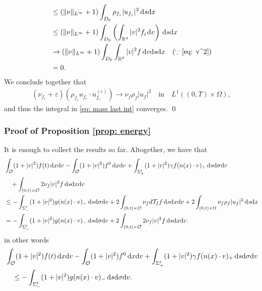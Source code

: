 \documentclass[10pt, reqno]{amsart}
\theoremstyle{plain}
\theoremstyle{definition}
\theoremstyle{remark}
\renewenvironment{proof}[1][\proofname]{\noindent{\scshape #1.\quad}}{\qed}
\numberwithin{equation}{section}
\newcommand{\calO}{\mathcal O}
\newcommand{\calT}{\mathcal T}
\newcommand{\R}{\mathbb{R}}
\newcommand{\ve}{\varepsilon}
\newcommand{\dx}{\textnormal{d}x}
\newcommand{\dv}{\textnormal{d}v}
\newcommand{\ds}{\textnormal{d}s}
\newcommand{\tnd}{\textnormal{d}}
\newcommand{\lt}{\left}
\newcommand{\rt}{\right}
\begin{document}
\begin{proof}
\begin{align*}
    &\le (\|\nu\|_{L^\infty}+1) \int_{D_0} \rho_{f_\ve} |u_{f_\ve}|^2 \,\ds\dx\\
    &\le (\|\nu\|_{L^\infty}+1) \int_{D_0}\lt(\int_{\R^d} |v|^2 f_\ve \dv \rt) \,\ds\dx \\
    &\to (\|\nu\|_{L^\infty}+1) \int_{D_0}\int_{\R^d} |v|^2 f \,\dv\ds\dx \quad (\because \eqref{eq: v^2}) \\
    &= 0.
\end{align*}
We conclude together that
\begin{align*}
    (\nu_{f_\ve} + \ve)(\rho_{f_\ve} u_{f_\ve} \cdot u_{f_\ve}^{(\ve)}) \to \nu_f \rho_f |u_f|^2 \quad \text{in}\quad L^1((0,T)\times\Omega),
\end{align*}
and thus the integral in \eqref{eq: mass last int} converges.
\end{proof}

\subsubsection{Proof of Proposition \ref{prop: energy}}

It is enough to collect the results so far. Altogether, we have that
\begin{align*}
    &\int_{\calO} (1+|v|^2) f(t) \,\dx\dv - \int_{\calO} (1+|v|^2) f^0 \,\dx\dv + \int_{\Sigma_+^t} (1+|v|^2) \gamma f (n(x)\cdot v)_+ \,\ds\tnd\sigma\dv \\
    &\quad + \int_{(0,t)\times\calO} 2\nu_f|v|^2 f \,\ds\dx\dv \\
    &\le - \int_{\Sigma_-^t} (1+|v|^2) g (n(x)\cdot v)_-  \,\ds\tnd\sigma\dv   + 2\int_{(0,t)\times \calO} \nu_f d\calT_f f \,\ds\dx\dv + 2 \int_{(0,t)\times \Omega} \nu_f \rho_f |u_f|^2 \,\ds\dx\\
    &= - \int_{\Sigma_-^t} (1+|v|^2) g (n(x)\cdot v)_- \,\ds\tnd\sigma\dv + 2\int_{(0,t)\times\calO} 2 \nu_f |v|^2 f \,\ds\dx\dv.
\end{align*}
in other words
\begin{align*}
    &\int_{\calO} (1+|v|^2) f(t) \,\dx\dv - \int_{\calO} (1+|v|^2) f^0 \,\dx\dv + \int_{\Sigma_+^t} (1+|v|^2) \gamma f (n(x)\cdot v)_+ \,\ds\tnd\sigma\dv\\
    &\quad\le -\int_{\Sigma_-^t} (1+|v|^2) g (n(x)\cdot v)_- \,\ds\tnd\sigma\dv.
\end{align*}



%
%
%
%
%
%
\end{document}
